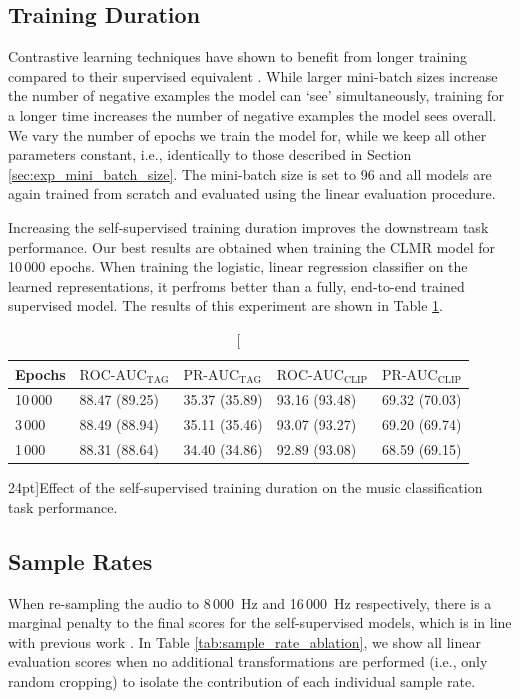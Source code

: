 \newpage

\subsection{Training Duration}
Contrastive learning techniques have shown to benefit from longer training compared to their supervised equivalent \cite{chen_simple_2020}. While larger mini-batch sizes increase the number of negative examples the model can `see' simultaneously, training for a longer time increases the number of negative examples the model sees overall. We vary the number of epochs we train the model for, while we keep all other parameters constant, i.e., identically to those described in Section \ref{sec:exp_mini_batch_size}. The mini-batch size is set to 96 and all models are again trained from scratch and evaluated using the linear evaluation procedure.

Increasing the self-supervised training duration improves the downstream task performance. Our best results are obtained when training the CLMR model for 10\,000 epochs. When training the logistic, linear regression classifier on the learned representations, it perfroms better than a fully, end-to-end trained supervised model. The results of this experiment are shown in Table \ref{tab:epoch_ablation}.


\begin{table}
    \centering
    \begin{tabular}{lllll}\toprule
    Epochs & $\text{ROC-AUC}_{\text{TAG}}$ & $\text{PR-AUC}_{\text{TAG}}$ & $\text{ROC-AUC}_{\text{CLIP}}$ & $\text{PR-AUC}_{\text{CLIP}}$ \\\midrule
    10\,000 & 88.47 (89.25) & 35.37 (35.89) & 93.16 (93.48) & 69.32 (70.03) \\
    3\,000 & 88.49 (88.94) & 35.11 (35.46) & 93.07 (93.27) & 69.20 (69.74) \\
    1\,000 & 88.31 (88.64) & 34.40 (34.86) & 92.89 (93.08) & 68.59 (69.15) \\\bottomrule
    \end{tabular}
    \caption[][24pt]{Effect of the self-supervised training duration on the music classification task performance.}
    \label{tab:epoch_ablation}
\end{table}




\subsection{Sample Rates}    
When re-sampling the audio to 8\,000~Hz and 16\,000~Hz respectively, there is a marginal penalty to the final scores for the self-supervised models, which is in line with previous work \cite{lee2018samplecnn}. In Table \ref{tab:sample_rate_ablation}, we show all linear evaluation scores when no additional transformations are performed (i.e., only random cropping) to isolate the contribution of each individual sample rate.


